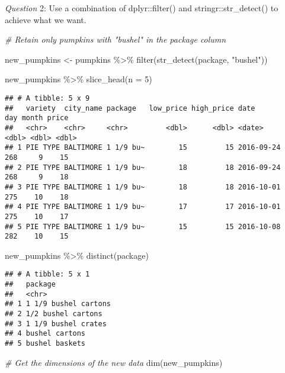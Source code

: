 \documentclass[
]{article}
\newenvironment{Shaded}{\begin{snugshade}}{\end{snugshade}}
\newcommand{\AttributeTok}[1]{\textcolor[rgb]{0.77,0.63,0.00}{#1}}
\newcommand{\CommentTok}[1]{\textcolor[rgb]{0.56,0.35,0.01}{\textit{#1}}}
\newcommand{\DecValTok}[1]{\textcolor[rgb]{0.00,0.00,0.81}{#1}}
\newcommand{\FunctionTok}[1]{\textcolor[rgb]{0.00,0.00,0.00}{#1}}
\newcommand{\NormalTok}[1]{#1}
\newcommand{\OtherTok}[1]{\textcolor[rgb]{0.56,0.35,0.01}{#1}}
\newcommand{\SpecialCharTok}[1]{\textcolor[rgb]{0.00,0.00,0.00}{#1}}
\newcommand{\StringTok}[1]{\textcolor[rgb]{0.31,0.60,0.02}{#1}}
\begin{document}
\emph{Question} 2: Use a combination of dplyr::filter() and
stringr::str\_detect() to achieve what we want.

\begin{Shaded}
\begin{Highlighting}[]
\CommentTok{\# Retain only pumpkins with "bushel" in the package column}

\NormalTok{new\_pumpkins }\OtherTok{\textless{}{-}}\NormalTok{ pumpkins }\SpecialCharTok{\%\textgreater{}\%} 
  \FunctionTok{filter}\NormalTok{(}\FunctionTok{str\_detect}\NormalTok{(package, }\StringTok{"bushel"}\NormalTok{))}

\NormalTok{new\_pumpkins }\SpecialCharTok{\%\textgreater{}\%} \FunctionTok{slice\_head}\NormalTok{(}\AttributeTok{n =} \DecValTok{5}\NormalTok{)}
\end{Highlighting}
\end{Shaded}

\begin{verbatim}
## # A tibble: 5 x 9
##   variety  city_name package   low_price high_price date         day month price
##   <chr>    <chr>     <chr>         <dbl>      <dbl> <date>     <dbl> <dbl> <dbl>
## 1 PIE TYPE BALTIMORE 1 1/9 bu~        15         15 2016-09-24   268     9    15
## 2 PIE TYPE BALTIMORE 1 1/9 bu~        18         18 2016-09-24   268     9    18
## 3 PIE TYPE BALTIMORE 1 1/9 bu~        18         18 2016-10-01   275    10    18
## 4 PIE TYPE BALTIMORE 1 1/9 bu~        17         17 2016-10-01   275    10    17
## 5 PIE TYPE BALTIMORE 1 1/9 bu~        15         15 2016-10-08   282    10    15
\end{verbatim}

\begin{Shaded}
\begin{Highlighting}[]
\NormalTok{new\_pumpkins }\SpecialCharTok{\%\textgreater{}\%} \FunctionTok{distinct}\NormalTok{(package)}
\end{Highlighting}
\end{Shaded}

\begin{verbatim}
## # A tibble: 5 x 1
##   package             
##   <chr>               
## 1 1 1/9 bushel cartons
## 2 1/2 bushel cartons  
## 3 1 1/9 bushel crates 
## 4 bushel cartons      
## 5 bushel baskets
\end{verbatim}

\begin{Shaded}
\begin{Highlighting}[]
\CommentTok{\# Get the dimensions of the new data}
\FunctionTok{dim}\NormalTok{(new\_pumpkins)}
\end{Highlighting}
\end{Shaded}
\end{document}
